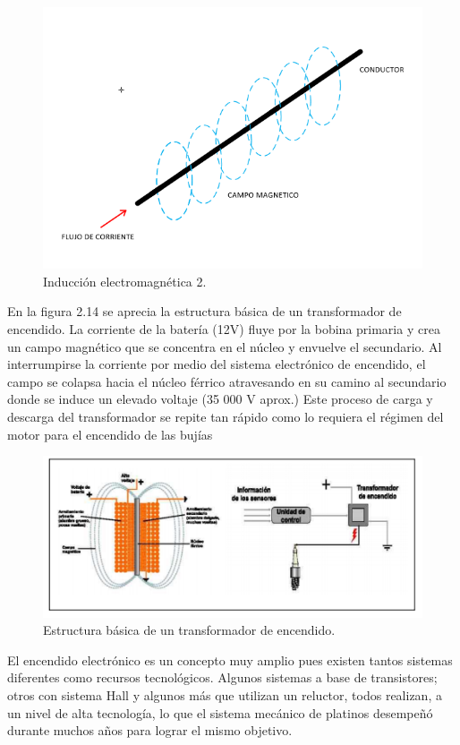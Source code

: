 \begin{figure}[H]
\centering
\includegraphics[width=12cm]{capitulo3/figs/trans2.png}
\caption{ Inducción electromagnética 2.}
\end{figure}

En la figura 2.14 se aprecia la estructura básica de un transformador
de encendido. La corriente de la batería (12V) fluye por la bobina
primaria y crea un campo magnético que se concentra en el
núcleo y envuelve el secundario. Al interrumpirse la corriente
por medio del sistema electrónico de encendido, el campo se colapsa
hacia el núcleo férrico atravesando en su camino al 
secundario donde se induce un elevado voltaje (35 000 V aprox.) Este
proceso de carga y descarga del transformador se repite tan rápido como
lo requiera el régimen del motor para el encendido de las bujías


\begin{figure}[H]
\centering
\includegraphics[width=12cm]{capitulo3/figs/trans3.png}
\caption{ Estructura básica de un transformador de encendido.}
\end{figure}

El encendido electrónico es un concepto muy amplio pues existen
tantos sistemas diferentes como recursos tecnológicos. Algunos sistemas
a base de transistores; otros con sistema Hall y algunos más que utilizan
un reluctor, todos realizan, a un nivel de alta tecnología, lo que el sistema
mecánico de platinos desempeñó durante muchos años para lograr el
mismo objetivo.\\

